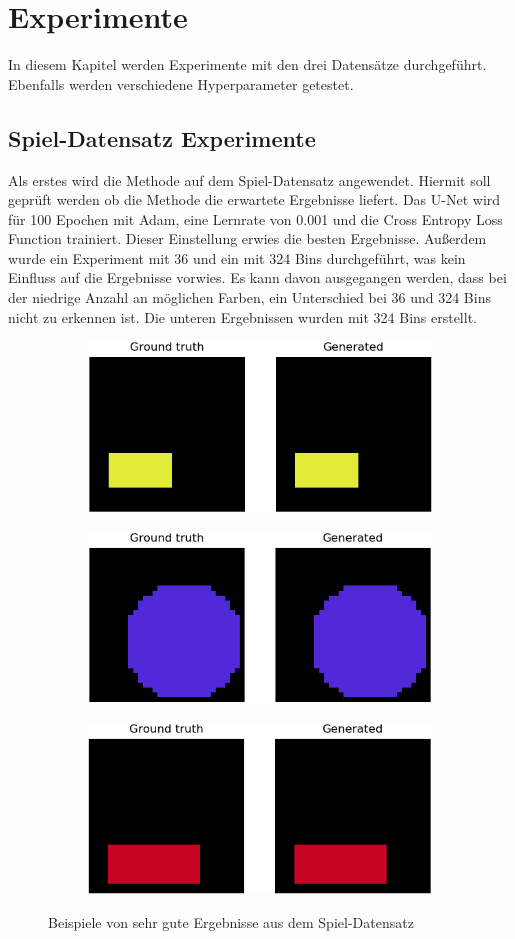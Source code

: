 \chapter{Experimente}
In diesem Kapitel werden Experimente mit den drei Datensätze durchgeführt. Ebenfalls werden verschiedene Hyperparameter getestet.

\section{Spiel-Datensatz Experimente}
Als erstes wird die Methode auf dem Spiel-Datensatz angewendet. Hiermit soll geprüft werden ob die Methode die erwartete
Ergebnisse liefert. Das U-Net wird für 100 Epochen mit Adam, eine Lernrate von 0.001 und die Cross Entropy Loss Function trainiert. Dieser
Einstellung erwies die besten Ergebnisse. Außerdem wurde ein Experiment mit 36 und ein mit 324 Bins durchgeführt, was kein Einfluss auf die 
Ergebnisse vorwies. Es kann davon ausgegangen werden, dass bei der niedrige Anzahl an möglichen Farben, ein Unterschied bei 36 und 324 Bins
nicht zu erkennen ist. Die unteren Ergebnissen wurden mit 324 Bins erstellt.

\begin{figure}[H]
  \vspace{1cm}
  \begin{subfigure}
    \centering
    \includegraphics[width=.32\textwidth]{resources/experiments/30.png}
  \end{subfigure}
  \begin{subfigure}
    \centering
    \includegraphics[width=.32\textwidth]{resources/experiments/31.png}
  \end{subfigure}
  \begin{subfigure}
    \centering
    \includegraphics[width=.32\textwidth]{resources/experiments/42.png}
  \end{subfigure}
  \caption{Beispiele von sehr gute Ergebnisse aus dem Spiel-Datensatz}
  \label{image:gute-ergebnisse-toy-dataset}
\end{figure}

